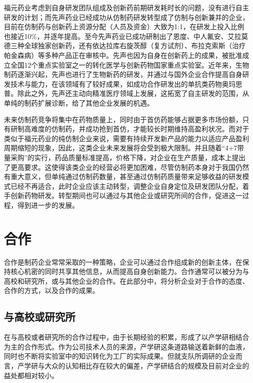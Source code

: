 \documentclass[twocolumn,openany]{ctexbook}
\begin{document}
			福元药业考虑到自身研发团队组成及创新药前期研发耗时长的问题，没有进行自主研发的计划；而先声药业已经成功从仿制药研发转型成了仿制与创新兼并的企业，目前在仿制药与创新药上资源分配（人员及资金）大致为1:1，在研发上投入比例也接近10\%，并逐年提高。至今先声药业已成功研制出了恩度、中人氟安、艾拉莫德三种全球独家创新药，还有依达拉库右旋茨醇（复方试剂）、布拉克索斯（治疗帕金森病）等多种产品正在审核中。先声也因为自身在创新药上的成果，被批准成立全国12个重点实验室之一的转化医学与创新药物国家重点实验室。近年来，生物制药逐渐兴起，先声也进行了生物新药的研发，并通过与国外企业合作提高自身研发技术与能力，在该领域有了较好成果，如成功合作研发出的单抗类药物奥玛思普。除此之外，先声还主动向精准医疗领域上发展，这拓宽了自主研发的范围，从单纯的制药扩展诊断，给了其他企业发展的机遇。
			
			\begin{framed}
				未来仿制药竞争将集中在药物质量上，同时由于首仿药能够占据更多市场份额，只有研制高难度的仿制药，并成功抢到首仿，才能较长时期维持高盈利状况。而对于类似于福元药业的纯仿制企业来说，需要有持续开发新产品的能力以适应产品盈利周期缩短的现象，因此，这类企业未来发展将会受到极大限制。并且随着“4+7带量采购”的实行，药品质量标准提高，价格下降，对企业在生产质量，成本上提出了更高要求。这使得该类企业的经营必将更加困难，尽管仿制药本身对于我国仍然有重大意义，但单纯通过仿制药数量，甚至通过仿制药质量带来足够收益的研发模式已经不再适合，此时企业应该主动转型，调整企业自身定位及研发团队分配，着手创新药物研发。转型期间也可以通过与其他企业或研究所间的合作，促进这一过程，得到进一步的发展。
			\end{framed}
			
		\section{合作}
		合作是制药企业常常采取的一种策略，企业可以通过合作组成新的创新主体，在保持核心机密的同时共享其他信息，从而提高自身创新能力。合作通常可以被分为与高校和研究所，或与其他企业的合作。在此部分中，将分析企业对于合作的态度、合作的方式，以及合作的成果。
		
			\subsection{与高校或研究所}
			在与高校或者研究所的合作过程中，由于长期经验的积累，形成了以产学研相结合为主的合作形式。作为公司技术人员的来源，产学研这条道路输送着新鲜的血液，同时也不断将实验室中的知识转化为工厂的实际成果。但就支队所调研的企业而言，产学研与大众的认知相比存在较大的偏差，产学研结合的规模及目前对企业的益处都相对较小。
			
\end{document}
